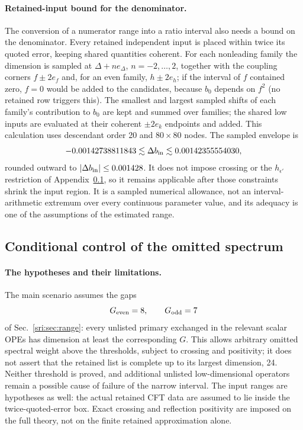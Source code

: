 \paragraph{Retained-input bound for the denominator.} The conversion of a numerator range into a ratio interval also
needs a bound on the denominator. Every retained independent input is placed within twice its quoted error, keeping
shared quantities coherent. For each nonleading family the dimension is sampled at $\Delta+ne_\Delta$, $n=-2,\dots,2$,
together with the coupling corners $f\pm2e_f$ and, for an even family, $h\pm2e_h$; if the interval of $f$ contained
zero, $f=0$ would be added to the candidates, because $b_0$ depends on $f^2$ (no retained row triggers this). The
smallest and largest sampled shifts of each family's contribution to $b_0$ are kept and summed over families; the
shared low inputs are evaluated at their coherent $\pm2e_k$ endpoints and added. This calculation uses descendant order
20 and $80\times80$ nodes. The sampled envelope is
\begin{equation}
 -0.00142738811843\lesssim\Delta b_{\rm in}\lesssim0.00142355554030,
 \label{sri:eq:cone:denbox}
\end{equation}
rounded outward to $|\Delta b_{\rm in}|\le0.001428$. It does not impose crossing or the $h_{\epsilon'}$ restriction of
Appendix~\ref{sri:app:cone:tails}, so it remains applicable after those constraints shrink the input region. It is a sampled
numerical allowance, not an interval-arithmetic extremum over every continuous parameter value, and its adequacy is one
of the assumptions of the estimated range.

\subsection{Conditional control of the omitted spectrum}\label{sri:app:cone:tails}
\paragraph{The hypotheses and their limitations.} The main scenario assumes the gaps
\begin{equation}
 G_{\rm even}=8,\qquad G_{\rm odd}=7
 \label{sri:eq:cone:gaps}
\end{equation}
of Sec.~\ref{sri:sec:range}: every unlisted primary exchanged in the relevant scalar OPEs has dimension at least the
corresponding $G$. This allows arbitrary omitted spectral weight above the thresholds, subject to crossing and
positivity; it does not assert that the retained list is complete up to its largest dimension, 24. Neither threshold is
proved, and additional unlisted low-dimensional operators remain a possible cause of failure of the narrow interval.
The input ranges are hypotheses as well: the actual retained CFT data are assumed to lie inside the
twice-quoted-error box. Exact crossing and reflection positivity are imposed on the full theory, not on the finite
retained approximation alone.

